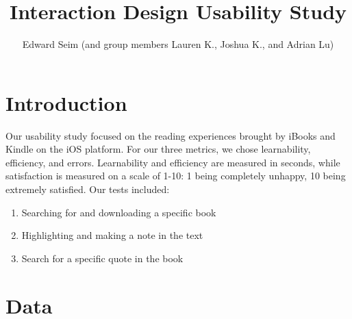\documentclass[12pt,letterpaper]{article}
\title{Interaction Design Usability Study}
\author{Edward Seim (and group members Lauren K., Joshua K., and Adrian Lu)}
\begin{document}
    \maketitle
    
    \section{Introduction}
    \label{Introduction}

    Our usability study focused on the reading experiences brought by iBooks and Kindle on the iOS platform.
    For our three metrics, we chose learnability, efficiency, and errors. Learnability and efficiency are measured in seconds, while satisfaction is measured on a scale of 1-10: 1 being completely unhappy, 10 being extremely satisfied. Our tests included:

    \begin{enumerate}
        \item Searching for and downloading a specific book
        \item Highlighting and making a note in the text
        \item Search for a specific quote in the book
    \end{enumerate}

    \section{Data}
    \label{Data}
\end{document}

